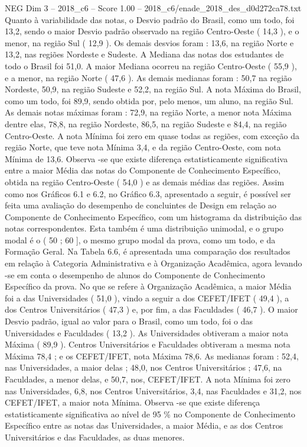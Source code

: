 \begin{textsample}{NEG Dim 3 – 2018\_c6 – Score 1.00 – 2018\_c6/enade\_2018\_des\_d0d272ca78.txt}
Quanto à variabilidade das notas, o Desvio padrão do Brasil, como um todo, foi 13,2, sendo o maior Desvio padrão observado na região Centro-Oeste ( 14,3 ), e o menor, na região Sul ( 12,9 ).
Os demais desvios foram : 13,6, na região Norte e 13,2, nas regiões Nordeste e Sudeste.
A Mediana das notas dos estudantes de todo o Brasil foi 51,0.
A maior Mediana ocorreu na região Centro-Oeste ( 55,9 ), e a menor, na região Norte ( 47,6 ).
As demais medianas foram : 50,7 na região Nordeste, 50,9, na região Sudeste e 52,2, na região Sul.
A nota Máxima do Brasil, como um todo, foi 89,9, sendo obtida por, pelo menos, um aluno, na região Sul.
As demais notas máximas foram : 72,9, na região Norte, a menor nota Máxima dentre elas, 78,8, na região Nordeste, 86,5, na região Sudeste e 84,4, na região Centro-Oeste.
A nota Mínima foi zero em quase todas as regiões, com exceção da região Norte, que teve nota Mínima 3,4, e da região Centro-Oeste, com nota Mínima de 13,6.
Observa -se que existe diferença estatisticamente significativa entre a maior Média das notas do Componente de Conhecimento Específico, obtida na região Centro-Oeste ( 54,0 ) e as demais médias das regiões.
Assim como nos Gráficos 6.1 e 6.2, no Gráfico 6.3, apresentado a seguir, é possível ser feita uma avaliação do desempenho de concluintes de Design em relação ao Componente de Conhecimento Específico, com um histograma da distribuição das notas correspondentes.
Esta também é uma distribuição unimodal, e o grupo modal é o ( 50 ; 60 ], o mesmo grupo modal da prova, como um todo, e da Formação Geral.
Na Tabela 6.6, é apresentada uma comparação dos resultados em relação à Categoria Administrativa e à Organização Acadêmica, agora levando -se em conta o desempenho de alunos do Componente de Conhecimento Específico da prova.
No que se refere à Organização Acadêmica, a maior Média foi a das Universidades ( 51,0 ), vindo a seguir a dos CEFET/IFET ( 49,4 ), a dos Centros Universitários ( 47,3 ) e, por fim, a das Faculdades ( 46,7 ).
O maior Desvio padrão, igual ao valor para o Brasil, como um todo, foi o das Universidades e Faculdades ( 13,2 ).
As Universidades obtiveram a maior nota Máxima ( 89,9 ).
Centros Universitários e Faculdades obtiveram a mesma nota Máxima 78,4 ; e os CEFET/IFET, nota Máxima 78,6.
As medianas foram : 52,4, nas Universidades, a maior delas ; 48,0, nos Centros Universitários ; 47,6, na Faculdades, a menor delas, e 50,7, nos, CEFET/IFET.
A nota Mínima foi zero nas Universidades, 6,8, nos Centros Universitários, 3,4, nas Faculdades e 31,2, nos CEFET/IFET, a maior nota Mínima.
Observa -se que existe diferença estatisticamente significativa ao nível de 95 \% no Componente de Conhecimento Específico entre as notas das Universidades, a maior Média, e as dos Centros Universitários e das Faculdades, as duas menores.

\end{textsample}
